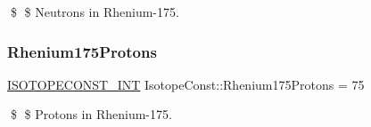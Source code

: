 \$ \$ Neutrons in Rhenium-\/175. \mbox{\label{group___isotope_const-_rhenium-_re175_gab89c4481870a624871a5bb51f42f4676}} 
\subsubsection{\texorpdfstring{Rhenium175\+Protons}{Rhenium175Protons}}
{\footnotesize\ttfamily \mbox{\hyperlink{group___isotope_const-_macros_ga5f18360b3e99483a35c32d789e62621c}{I\+S\+O\+T\+O\+P\+E\+C\+O\+N\+S\+T\+\_\+\+I\+NT}} Isotope\+Const\+::\+Rhenium175\+Protons = 75}

\$ \$ Protons in Rhenium-\/175. 